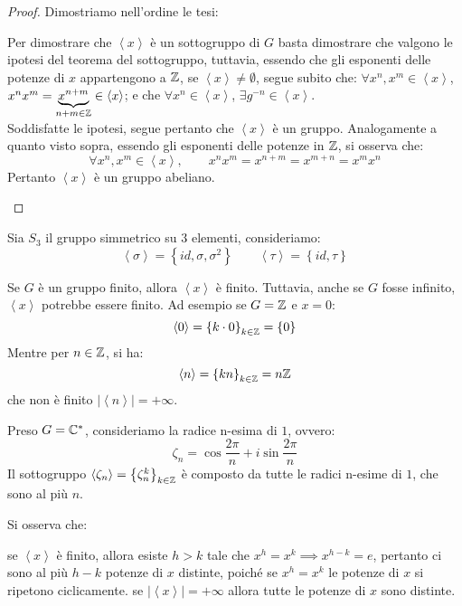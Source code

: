 \documentclass[11pt]{scrartcl}
\begin{document}
\begin{proof}
Dimostriamo nell'ordine le tesi:
\begin{enumerate}[(1)]
	\ii Per dimostrare che $\left<x\right>$ è un sottogruppo di $G$ basta dimostrare che valgono le ipotesi del teorema del sottogruppo, tuttavia, essendo che gli esponenti delle potenze di $x$ appartengono a $\mathbb Z$, se $\left<x\right> \neq \emptyset$, segue subito che: $\forall x^n,x^m \in \left<x\right>$, $x^nx^m=\underbrace{x^{n+m}}_{n+m \in \mathbb Z} \in \left<x\right>$; e che $\forall x^n \in \left<x\right>$, $\exists g^{-n} \in \left<x\right>$. \\
	Soddisfatte le ipotesi, segue pertanto che $\left<x\right>$ è un gruppo.
	\ii Analogamente a quanto visto sopra, essendo gli esponenti delle potenze in $\mathbb Z$, si osserva che: 
	\[\forall x^n,x^m \in \left<x\right>, \qquad x^nx^m=x^{n+m}=x^{m+n}=x^mx^n\]
	Pertanto $\left<x\right>$ è un gruppo abeliano.
\end{enumerate}
\end{proof}

\begin{example}
Sia $S_3$ il gruppo simmetrico su $3$ elementi, consideriamo:
	\[
	\left<\sigma\right> = \left\{id, \sigma, \sigma^2\right\}
	\quad
	\quad
	\left<\tau\right> = \left\{id, \tau\right\}
	\]
\end{example}

\begin{remark}
\label{g:srg_inf}
	Se $G$ è un gruppo finito, allora $\left<x\right>$ è finito. Tuttavia, anche se $G$ fosse infinito, $\left<x\right>$ potrebbe essere finito.  Ad esempio se $G=\mathbb Z$ e $x=0$:
	\[ \left<0\right>
	=
	\left\{k \cdot 0\right\}_{k \in \mathbb Z}
	=
	\left\{0\right\}
	\]
	Mentre per $n \in \mathbb Z$, si ha:
	\[ \left<n\right>
	=
	\left\{kn\right\}_{k \in \mathbb Z}
	=
	n\mathbb Z
	\]
	che non è finito $|\left<n\right>|=+\infty$.
\end{remark}

\begin{example}
	Preso $G=\mathbb C^*$, consideriamo la radice n-esima di $1$, ovvero:
	\[
	\zeta_n
	=
	\cos{\frac{2\pi}{n}}
	+
	i\sin{\frac{2\pi}{n}}
	\]
	Il sottogruppo $\left<\zeta_n\right> = \left\{\zeta_n^k \right \}_{k \in \mathbb Z}$ è composto da tutte le radici n-esime di $1$, che sono al più $n$.
\end{example}

\begin{remark}
\label{rem:g_uno}
Si osserva che:
	\begin{itemize}
	\ii se $\left<x\right>$ è finito, allora esiste $h>k$ tale che $x^h=x^k \implies x^{h-k}=e$, pertanto ci sono al più $h-k$ potenze di $x$ distinte, poiché se $x^h=x^k$ le potenze di $x$ si ripetono ciclicamente.
	\ii se $|\left<x\right>|=+\infty$ allora tutte le potenze di $x$ sono distinte.
	\end{itemize}

\end{remark}
\end{document}
